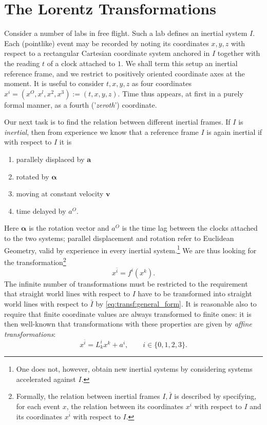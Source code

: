 \section{The Lorentz Transformations}
Consider a number of labs in free flight. Such a lab defines
an inertial system $ I $. Each (pointlike) event may be recorded by noting its coordinates $ x, y, z $ with respect to a rectangular Cartesian coordinate system anchored in $ I $ together with the reading $ t $ of a clock attached to $ 1 $. We shall term this setup an inertial reference frame, and we restrict to positively oriented coordinate axes at the moment.
It is useful to consider $ t,x,y,z $ as four coordinates $ x^i = (x^O,x^l,x^2,x^3):= (t,x,y,z) $.
Time thus appears, at first in a purely formal manner, as a fourth ('\emph{zeroth}') coordinate.

Our next task is to find the relation between different inertial frames. If $ I $ is \emph{inertial}, then from experience we know that a reference frame $ I $ is again inertial if with respect to $ I $ it is 
\begin{enumerate}
	\item parallely displaced by $ \mathbf{a} $
	\item rotated by $ \mathbf{\alpha} $
	\item moving at constant velocity $ \mathbf{v} $
	\item time delayed by $ a^O $.
\end{enumerate}
Here $ \mathbf{\alpha} $ is the rotation vector and $ a^O $ is the time lag between the clocks attached to the two systems; parallel displacement and rotation refer to Euclidean Geometry, valid by experience in every inertial system.\footnote{One does not, however, obtain new inertial systems by considering systems accelerated against $ I $.}
We are thus looking for the transformation\footnote{Formally, the relation between inertial frames $ I, \bar{I} $ is described by specifying, for each event $ x $, the relation between its coordinates $ x^i $ with respect to $ I $ and its coordinates $ x^{\bar{i}} $ with respect to $ I $.}
\begin{equation}
\label{eq:transf:general_form}
x^{\bar{i}}=f^i(x^k).
\end{equation}
The infinite number of transformations must be restricted to the requirement that straight world lines with respect to $ I $ have to be transformed into straight world lines with respect to $ \bar{I} $ by \eqref{eq:transf:general_form}. It is reasonable also to require that finite coordinate values are always transformed to finite ones: it is then well-known that transformations with these properties are given by \emph{affine transformations}:
\begin{equation}
x^{\bar{i}}=L^i_kx^k +a^i, \qquad i\in \{0,1,2,3\}.
\end{equation}